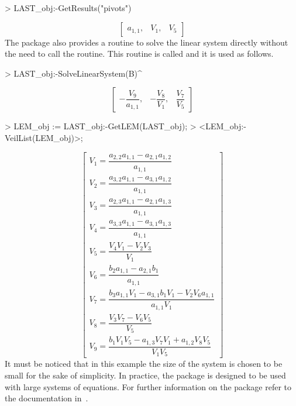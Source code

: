 \begin{example}
  \begin{mapleinline}
> LAST_obj:-GetResults("pivots")
  \end{mapleinline}
  \begin{equation*}
    \begin{bmatrix}
      a_{1,1}, & V_{1}, & V_{5}
    \end{bmatrix}
  \end{equation*}
  The \LAST{} package also provides a routine to solve the linear system directly without the need to call the  routine. This routine is called  and it is used as follows.
  \begin{mapleinline}
> LAST_obj:-SolveLinearSystem(B)^%
  \end{mapleinline}
  \begin{equation*}
    \begin{bmatrix}
      -\dfrac{V_{9}}{a_{1,1}}, &
      -\dfrac{V_{8}}{V_{1}}, &
      \dfrac{V_{7}}{V_{5}}
    \end{bmatrix}
  \end{equation*}
  \begin{mapleinline}
> LEM_obj := LAST_obj:-GetLEM(LAST_obj);
> <LEM_obj:-VeilList(LEM_obj)>;
  \end{mapleinline}
  \begin{equation*}
    \begin{bmatrix}
      V_{1} = \dfrac{a_{2,2}a_{1,1}-a_{2,1}a_{1,2}}{a_{1,1}} \\
      V_{2} = \dfrac{a_{3,2}a_{1,1}-a_{3,1}a_{1,2}}{a_{1,1}} \\
      V_{3} = \dfrac{a_{2,3}a_{1,1}-a_{2,1}a_{1,3}}{a_{1,1}} \\
      V_{4} = \dfrac{a_{3,3}a_{1,1}-a_{3,1}a_{1,3}}{a_{1,1}} \\
      V_{5} = \dfrac{V_{4}V_{1}-V_{2}V_{3}}{V_{1}} \\
      V_{6} = \dfrac{b_{2}a_{1,1}-a_{2,1}b_{1}}{a_{1,1}} \\
      V_{7} = \dfrac{b_{3}a_{1,1}V_{1}-a_{3,1}b_{1}V_{1}-V_{2}V_{6}a_{1,1}}{a_{1,1}V_{1}} \\
      V_{8} = \dfrac{V_{3}V_{7}-V_{6}V_{5}}{V_{5}} \\
      V_{9} = \dfrac{b_{1}V_{1}V_{5}-a_{1,3}V_{7}V_{1}+a_{1,2}V_{8}V_{5}}{V_{1}V_{5}}
    \end{bmatrix}
  \end{equation*}
  It must be noticed that in this example the size of the system is chosen to be small for the sake of simplicity. In practice, the \LAST{} package is designed to be used with large systems of equations. For further information on the \LAST{} package refer to the documentation in~\cite{last}.
\end{example}
